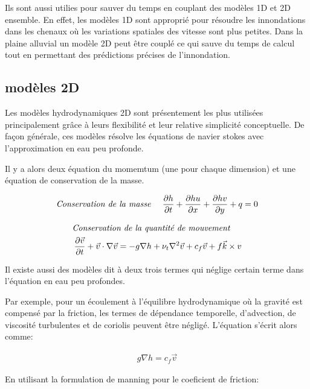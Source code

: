 \documentclass[12pt]{article}   %
\begin{document}
    Ils sont aussi utilies pour sauver du temps en couplant des modèles 1D et 2D ensemble. En effet, les modèles 1D sont approprié pour résoudre les innondations dans les chenaux où les variations spatiales des vitesse sont plus petites. Dans la plaine alluvial un modèle 2D peut être couplé ce qui sauve du temps de calcul tout en permettant des prédictions précises de l'innondation.\cite{Liu2015}
    
    \subsection{modèles 2D}
    
    Les modèles hydrodynamiques 2D sont présentement les plus utilisées principalement grâce à leurs flexibilité et leur relative simplicité conceptuelle. De façon générale, ces modèles résolve les équations de navier stokes avec l'approximation en eau peu profonde.
    
    Il y a alors deux équation du momemtum (une pour chaque dimension) et une équation de conservation de la masse.
    
    \begin{align}
        \textit{Conservation de la masse \quad} \frac{\partial h}{\partial t} + \frac{ \partial hu}{\partial x} + \frac{ \partial hv}{\partial y} + q  = 0 
        \label{masse2d}
    \end{align}
    
     \begin{align}
       \textit{Conservation de la quantité de mouvement \quad}\\
       \frac{\partial\Vec{v}}{\partial t} + \Vec{v}\cdot \nabla\Vec{v} = -g\nabla h + \nu_t \nabla^2 \Vec{v} + c_f  \Vec{v} + f\Vec{k}\times v
    \end{align}
    
    Il existe aussi des modèles dit à deux trois termes qui néglige certain terme dans l'équation en eau peu profondes. 
    
    Par exemple, pour un écoulement à l'équilibre hydrodynamique où la gravité est compensé par la friction, les termes de dépendance temporelle, d'advection, de viscosité turbulentes et de coriolis peuvent être négligé. L'équation s'écrit alors comme:
    
    \begin{align}
        g\nabla h = c_f  \Vec{v}
        \label{onde1}
    \end{align}
    
    En utilisant la formulation de manning pour le coeficient de friction:
    
\end{document}
